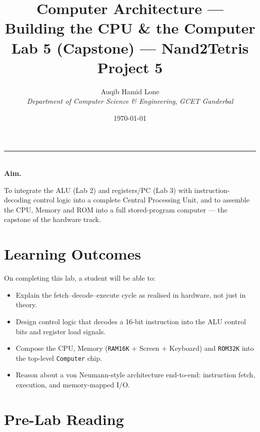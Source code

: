 \documentclass[11pt]{article}
\title{Computer Architecture --- Building the CPU \& the Computer\\\large Lab 5 (Capstone) --- Nand2Tetris Project 5}
\author{Auqib Hamid Lone\\[0.3em]
  \emph{Department of Computer Science \& Engineering}, \emph{GCET Ganderbal}}
\date{\today}
\newenvironment{aimbox}{%
  \par\noindent\begin{minipage}{\linewidth}\vspace{0.4em}
  \textcolor{primary-blue}{\rule{\linewidth}{0.8pt}}\\[0.3em]
  \textbf{\textcolor{primary-blue}{Aim.}}\ \itshape
}{%
  \end{minipage}\vspace{0.4em}\par
}
\begin{document}
\maketitle

\begin{aimbox}
To integrate the ALU (Lab 2) and registers/PC (Lab 3) with instruction-decoding control logic into a complete Central Processing Unit, and to assemble the CPU, Memory and ROM into a full stored-program computer --- the capstone of the hardware track.
\end{aimbox}

\section{Learning Outcomes}

On completing this lab, a student will be able to:
\begin{itemize}
  \item Explain the fetch--decode--execute cycle as realised in hardware, not just in theory.
  \item Design control logic that decodes a 16-bit instruction into the ALU control bits and register load signals.
  \item Compose the CPU, Memory (\texttt{RAM16K} + Screen + Keyboard) and \texttt{ROM32K} into the top-level \texttt{Computer} chip.
  \item Reason about a von Neumann-style architecture end-to-end: instruction fetch, execution, and memory-mapped I/O.
\end{itemize}

\section{Pre-Lab Reading}
\end{document}
